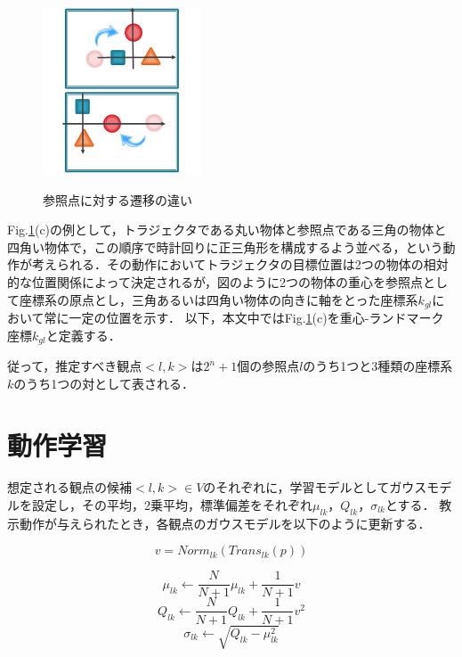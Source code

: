 \begin{figure}[h]
\begin{minipage}[t]{.3\textwidth}
		\centering
		\includegraphics[width=4.7cm]{figure2_sub_c.png} \\ %
		\label{subfigure:difference_displacement3}
	\end{minipage}
	\caption{参照点に対する遷移の違い}
	\label{figure:difference_displacement}
\end{figure}


Fig.\ref{figure:difference_displacement}(c)の例として，トラジェクタである丸い物体と参照点である三角の物体と四角い物体で，この順序で時計回りに正三角形を構成するよう並べる，という動作が考えられる．その動作においてトラジェクタの目標位置は2つの物体の相対的な位置関係によって決定されるが，図のように2つの物体の重心を参照点として座標系の原点とし，三角あるいは四角い物体の向きに軸をとった座標系$k_{gl}$において常に一定の位置を示す．
以下，本文中ではFig.\ref{figure:difference_displacement}(c)を重心-ランドマーク座標$k_{gl}$と定義する．

従って，推定すべき観点$<l , k>$は$2^{n}+1$個の参照点$l$のうち1つと3種類の座標系$k$のうち1つの対として表される．

\section{動作学習}

想定される観点の候補$<l , k>∈V$のそれぞれに，学習モデルとしてガウスモデルを設定し，その平均，2乗平均，標準偏差をそれぞれ$μ_{lk}$，$Q_{lk}$，$σ_{lk}$とする．
教示動作が与えられたとき，各観点のガウスモデルを以下のように更新する．

\begin{equation}
	v = Norm_{lk}(Trans_{lk}(p))
\end{equation}

\begin{equation}
	μ_{lk}  \leftarrow \frac{N}{N+1}μ_{lk}+\frac{1}{N+1}v
\end{equation}
\begin{equation}
	Q_{lk}  \leftarrow \frac{N}{N+1}Q_{lk}+\frac{1}{N+1}v^2	
\end{equation}
\begin{equation}
	σ_{lk}  \leftarrow \sqrt{Q_{lk} - μ_{lk}^2}
\end{equation}

